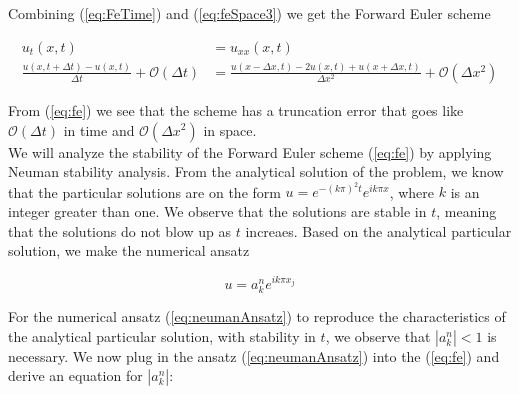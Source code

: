 \documentclass{article}
\begin{document}
Combining (\ref{eq:FeTime}) and (\ref{eq:feSpace3}) we get the Forward Euler scheme

\begin{subequations}
	\begin{align}
		u_t(x,t) &= u_{xx}(x,t)\\
		\frac{u(x, t+ \Delta t) - u(x,t)}{\Delta t} + \mathcal{O}(\Delta t) &= 
		\frac{u(x - \Delta x, t) - 2u(x,t) + u(x+ \Delta x, t)}{\Delta x^2} + \mathcal{O}(\Delta x^2)\label{eq:fe}
	\end{align}
\end{subequations}

From (\ref{eq:fe}) we see that the scheme has a truncation error that goes like $\mathcal{O} (\Delta t)$ in time and $\mathcal{O}(\Delta x^2)$ in space.\\

We will analyze the stability of the Forward Euler scheme (\ref{eq:fe}) by applying Neuman stability analysis. From the analytical solution of the problem, we know that the particular solutions are on the form $u = e^{-(k \pi)^2 t}e^{i k \pi x}$, where $k$ is an integer greater than one. We observe that the solutions are stable in $t$, meaning that the solutions do not blow up as $t$ increaes. Based on the analytical particular solution, we make the numerical ansatz 

\begin{equation}\label{eq:neumanAnsatz}
	u = a_k^n e^{i k \pi x_j}
\end{equation}

For the numerical ansatz (\ref{eq:neumanAnsatz}) to reproduce the characteristics of the analytical particular solution, with stability in $t$, we observe that $|a_k^n| < 1$ is necessary. We now plug in the ansatz (\ref{eq:neumanAnsatz}) into the (\ref{eq:fe}) and derive an equation for $|a_k^n|$:
\end{document}

